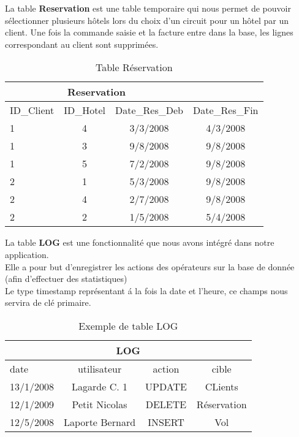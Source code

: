 \begin{table}[h]
La table \textbf{Reservation} est une table temporaire qui nous permet de pouvoir s\'electionner plusieurs h\^otels lors du choix d'un circuit pour un h\^otel par un client. Une fois la commande saisie et la facture entre dans la base, les lignes correspondant au client sont supprim\'ees.
\begin{center}
\begin{tabular}{|l|c|c|c|}
\hline
\multicolumn{3}{|c|}{Reservation}\\
\hline
ID\_Client& ID\_Hotel&Date\_Res\_Deb&Date\_Res\_Fin\\
\hline
1 & 4&3/3/2008&4/3/2008\\
\hline
1 & 3&9/8/2008&9/8/2008\\
\hline
1 & 5&7/2/2008&9/8/2008\\
\hline
2 & 1&5/3/2008&9/8/2008\\
\hline
2&4&2/7/2008&9/8/2008\\
\hline
2 & 2&1/5/2008&5/4/2008\\
\hline
\end{tabular}
\end{center}
\caption{Table R\'eservation}
\end{table}

\begin{table}[h]
 La table \textbf{LOG} est une fonctionnalit\'e que nous avons int\'egr\'e dans notre application. \\
 Elle a pour but d'enregistrer les actions des op\'erateurs sur la base de donn\'ee (afin d'effectuer des statistiques)\\
Le type timestamp repr\'esentant \'a la fois la date et l'heure, ce champs nous servira de cl\'e primaire.
\begin{center}
\begin{tabular}{|l|c|c|c|}
\hline
\multicolumn{4}{|c|}{LOG}\\
\hline
date&utilisateur&action&cible\\
\hline
13/1/2008 &Lagarde C. 1&UPDATE&CLients\\
\hline
12/1/2009 &Petit Nicolas&DELETE&R\'eservation\\
\hline
12/5/2008 &Laporte Bernard&INSERT&Vol\\
\hline
\end{tabular}
\end{center}
\caption{Exemple de table LOG}
\end{table}
\newpage


